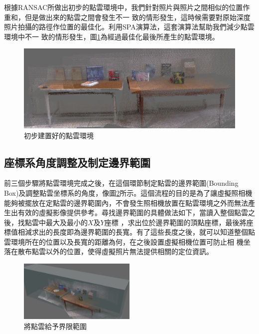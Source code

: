 根據RANSAC所做出初步的點雲環境中，我們針對照片與照片之間相似的位置作重和，但是做出來的點雲之間會發生不一
致的情形發生，這時候需要對原始深度照片拍攝的路徑作位置的最佳化。利用SPA演算法\cite{Konolige2010}，這套演算法幫助我們減少點雲環境中不一
致的情形發生，圖\ref{fig:Point Cloud Map}為經過最佳化最後所產生的點雲環境。

\begin{figure}
  \includegraphics[width=\textwidth]{figures/3DPoint_Cloud_Map.jpg}
  \caption{初步建置好的點雲環境}
  \label{fig:Point Cloud Map}
\end{figure}

\subsection{座標系角度調整及制定邊界範圍}
     
    前三個步驟將點雲環境完成之後，在這個環節制定點雲的邊界範圍(Bounding Box)及調整點雲坐標系的角度，像圖\ref{fig:Bounding Box}所示。這個流程的目的是為了讓虛擬照相機
    能夠被擺放在定點雲的邊界範圍內，不會發生照相機放置在點雲環境之外而無法產生出有效的虛擬影像提供參考。尋找邊界範圍的具體做法如下，當讀入整個點雲之後，找點雲中最大及最小的$X$及$Y$座標
    ，求出位於邊界範圍的頂點座標，最後將座標值相減求出的長度即為邊界範圍的長寬。有了這些長度之後，就可以知道整個點雲環境所在的位置以及長寬的距離為何，在之後設置虛擬相機位置可防止相
    機坐落在散布點雲以外的位置，使得虛擬照片無法提供相關的定位資訊。

\begin{figure}
\begin{center}
  \includegraphics[width=0.5\textwidth]{figures/Bounding_Box.jpg}
  \caption{將點雲給予界限範圍}
  \label{fig:Bounding Box}
\end{center}
\end{figure}   
    

